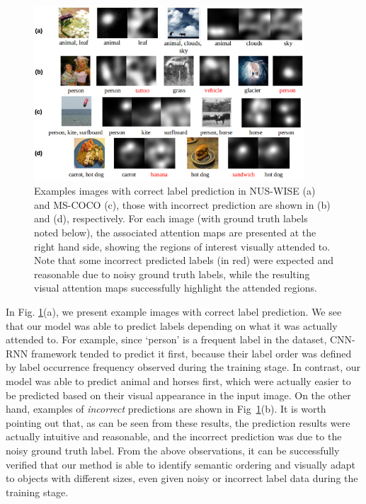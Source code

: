 \documentclass[letterpaper]{article} %
\begin{document}
\begin{figure}[t!]
	\centering
	\includegraphics[width=0.9\textwidth]{./Visualization.png}
	\caption{Examples images with correct label prediction in NUS-WISE (a) and MS-COCO (c), those with incorrect prediction are shown in (b) and (d), respectively. For each image (with ground truth labels noted below), the associated attention maps are presented at the right hand side, showing the regions of interest visually attended to. Note that some incorrect predicted labels (in red) were expected and reasonable due to noisy ground truth labels, while the resulting visual attention maps successfully highlight the attended regions.}
	\label{fig:visualization}
\end{figure}


In Fig. \ref{fig:visualization}(a), we present example images with correct label prediction. We see that our model was able to predict labels depending on what it was actually attended to. For example, since `person' is a frequent label in the dataset, CNN-RNN framework tended to predict it first, because their label order was defined by label occurrence frequency observed during the training stage. In contrast, our model was able to predict animal and horses first, which were actually easier to be predicted based on their visual appearance in the input image. On the other hand, examples of \emph{incorrect} predictions are shown in Fig~\ref{fig:visualization}(b). It is worth pointing out that, as can be seen from these results, the prediction results were actually intuitive and reasonable, and the incorrect prediction was due to the noisy ground truth label. From the above observations, it can be successfully verified that our method is able to identify semantic ordering and visually adapt to objects with different sizes, even given noisy or incorrect label data during the training stage.
\end{document}
